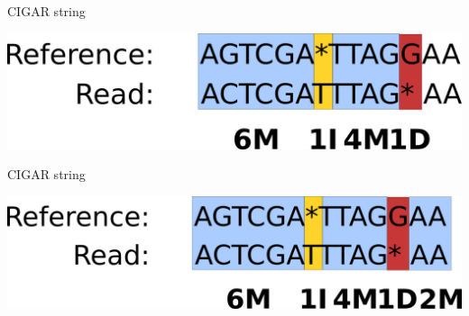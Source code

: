 \documentclass{beamer}
\begin{document}
\begin{frame}{CIGAR string}
  \begin{center}
    \includegraphics[width=\linewidth, keepaspectratio]{pic/c5.png}
  \end{center}
\end{frame}

\begin{frame}{CIGAR string}
  \begin{center}
    \includegraphics[width=\linewidth, keepaspectratio]{pic/c6.png}
  \end{center}
\end{frame}
\end{document}
